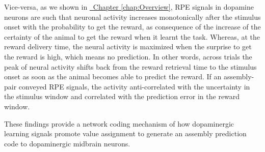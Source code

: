 \begin{itemize}
    Vice-versa, as we shown in \hyperref[chap:Overview]{~Chapter \ref*{chap:Overview}}, RPE signals in dopamine neurons are such that neuronal activity increases monotonically after the stimulus onset with the probability to get the reward, as consequence of the increase of the certainty of the animal to get the reward when it learnt the task. Whereas, at the reward delivery time, the neural activity is maximized when the surprise to get the reward is high, which means no prediction. In other words, across trials the peak of neural activity shifts back from the reward retrieval time to the stimulus onset as soon as the animal becomes able to predict the reward.
    If an assembly-pair conveyed RPE signals, the activity anti-correlated with the uncertainty in the stimulus window and correlated with the prediction error in the reward window.
\end{itemize}
  These findings provide a network coding mechanism of how dopaminergic learning signals promote value assignment to generate an assembly prediction code to dopaminergic midbrain neurons. 